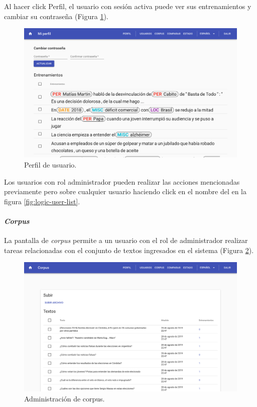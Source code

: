 \documentclass[12pt,a4paper,]{scrartcl}
\let\oldparagraph\paragraph
\renewcommand{\paragraph}[1]{\oldparagraph{#1}\mbox{}}
\begin{document}
Al hacer click Perfil, el usuario con sesión activa puede ver sus entrenamientos y cambiar su contraseña (Figura \ref{fig:logic-user-profile}).

\begin{figure}[H]

{\centering \includegraphics{assets/logic/user-profile.pdf} 

}

\caption{Perfil de usuario.}\label{fig:logic-user-profile}
\end{figure}

Los usuarios con rol administrador pueden realizar las acciones mencionadas previamente pero sobre cualquier usuario haciendo click en el nombre del en la figura \ref{fig:logic-user-list}.

\hypertarget{corpus}{%
\paragraph{\texorpdfstring{\emph{Corpus}}{Corpus}}\label{corpus}}

La pantalla de \emph{corpus} permite a un usuario con el rol de administrador realizar tareas relacionadas con el conjunto de textos ingresados en el sistema (Figura \ref{fig:logic-corpus-management}).

\begin{figure}[H]

{\centering \includegraphics{assets/logic/corpus-management.pdf} 

}

\caption{Administración de corpus.}\label{fig:logic-corpus-management}
\end{figure}
\end{document}
